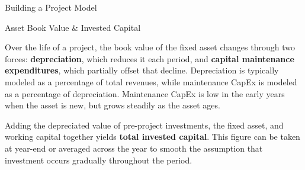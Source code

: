\documentclass[10pt]{article}
\begin{document}
\begin{core}{Building a Project Model}

    \end{core}

    \begin{core}{Asset Book Value \& Invested Capital}

      Over the life of a project, the book value of the fixed asset changes through two forces: \textbf{depreciation}, which reduces it each period, and \textbf{capital maintenance expenditures}, which partially offset that decline. Depreciation is typically modeled as a percentage of total revenues, while maintenance CapEx is modeled as a percentage of depreciation. Maintenance CapEx is low in the early years when the asset is new, but grows steadily as the asset ages.

      Adding the depreciated value of pre-project investments, the fixed asset, and working capital together yields \textbf{total invested capital}. This figure can be taken at year-end or averaged across the year to smooth the assumption that investment occurs gradually throughout the period.


    \end{core}
\end{document}
